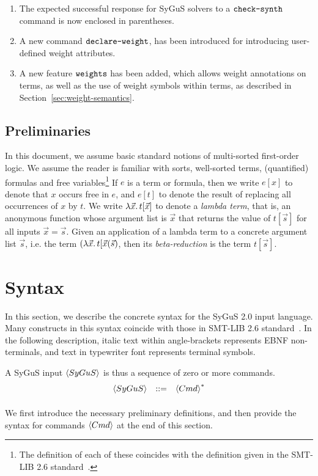 \documentclass[english,a4paper,10pt]{article}
\begin{document}
\begin{enumerate}
\item The expected successful response for SyGuS solvers to a $\texttt{check-synth}$ command is now enclosed in parentheses.

\item A new command $\texttt{declare-weight}$, has been introduced for introducing user-defined weight attributes.

\item A new feature $\texttt{weights}$ has been added, which allows weight annotations on terms, 
as well as the use of weight symbols within terms, as described in Section~\ref{sec:weight-semantics}.
\end{enumerate}


\subsection{Preliminaries}
In this document, we assume basic standard notions of
multi-sorted first-order logic.
We assume the reader is familiar
with sorts, well-sorted terms, (quantified) formulas
and free variables\footnote{
The definition of each of these coincides with
the definition given in the SMT-LIB 2.6 standard~\cite{BarFT-RR-17}.
}
If $e$ is a term or formula,
then we write $e[x]$ to denote that $x$ occurs free in $e$,
and $e[t]$ to denote the result of replacing all occurrences of $x$ by $t$.
We write $\lambda \vec{x} \ldotp t[\vec{x}]$ to denote a \emph{lambda term},
that is, an anonymous function whose argument list is $\vec{x}$
that returns the value of $t[\vec{s}]$ for all inputs $\vec{x} = \vec{s}$.
Given an application of a lambda term to a concrete argument list $\vec{s}$,
i.e. the term $(\lambda \vec{x} \ldotp t[\vec{x}( \vec{s} )$,
then its \emph{beta-reduction} is the term $t[\vec{s}]$.

\section{Syntax}
\label{sec:syntax}

In this section, we describe the concrete syntax
for the SyGuS 2.0 input language.
Many constructs in this syntax coincide
with those in SMT-LIB 2.6 standard~\cite{BarFT-RR-17}.
In the following description,
italic text within angle-brackets represents EBNF non-terminals,
and text in typewriter font represents terminal symbols.

A SyGuS input $\left\langle SyGuS\right\rangle$ is thus a sequence of zero or more commands.
\[
\begin{array}{rcl}
\left\langle SyGuS\right\rangle & ::= & \left\langle Cmd\right\rangle^{*}\\[2ex]
\end{array}
\]
We first introduce the necessary preliminary definitions,
and then provide the syntax for commands $\left\langle Cmd\right\rangle$ at the end of this section.
\end{document}
